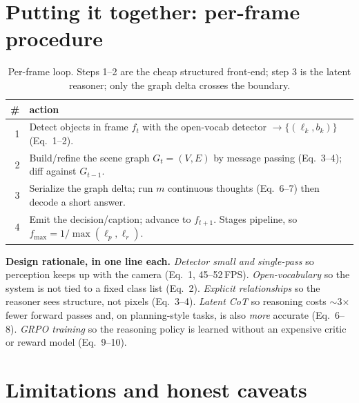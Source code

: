\documentclass[10pt,letterpaper]{article}
\begin{document}
\section{Putting it together: per-frame procedure}

\begin{table}[H]
\centering
\caption{Per-frame loop. Steps 1--2 are the cheap structured front-end; step 3 is the latent
reasoner; only the graph delta crosses the boundary.}
\begin{tabular}{rp{12.6cm}}
\toprule
\# & action \\
\midrule
1 & Detect objects in frame $f_t$ with the open-vocab detector $\to \{(\ell_k,b_k)\}$ (Eq.~1--2). \\
2 & Build/refine the scene graph $G_t=(V,E)$ by message passing (Eq.~3--4); diff against $G_{t-1}$. \\
3 & Serialize the graph delta; run $m$ continuous thoughts (Eq.~6--7) then decode a short answer. \\
4 & Emit the decision/caption; advance to $f_{t+1}$. Stages pipeline, so $f_{\max}=1/\max(\ell_p,\ell_r)$. \\
\bottomrule
\end{tabular}
\end{table}

\textbf{Design rationale, in one line each.} \emph{Detector small and single-pass} so perception
keeps up with the camera (Eq.~1, 45--52\,FPS). \emph{Open-vocabulary} so the system is not tied to
a fixed class list (Eq.~2). \emph{Explicit relationships} so the reasoner sees structure, not
pixels (Eq.~3--4). \emph{Latent CoT} so reasoning costs $\sim$3$\times$ fewer forward passes and, on
planning-style tasks, is also \emph{more} accurate (Eq.~6--8). \emph{GRPO training} so the reasoning
policy is learned without an expensive critic or reward model (Eq.~9--10).

\section{Limitations and honest caveats}
\end{document}
